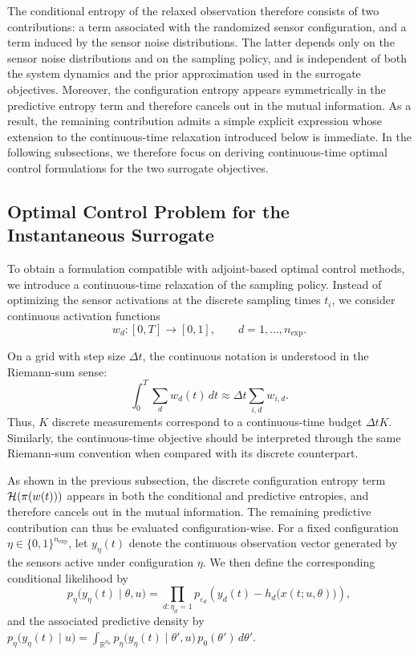 \documentclass[a4paper,11pt]{article}
\begin{document}
The conditional entropy of the relaxed observation therefore consists of two contributions: a term associated with the randomized sensor configuration, and a term induced by the sensor noise distributions. The latter depends only on the sensor noise distributions and on the sampling policy, and is independent of both the system dynamics and the prior approximation used in the surrogate objectives. Moreover, the configuration entropy appears symmetrically in the predictive entropy term and therefore cancels out in the mutual information. As a result, the remaining contribution admits a simple explicit expression whose extension to the continuous-time relaxation introduced below is immediate. In the following subsections, we therefore focus on deriving continuous-time optimal control formulations for the two surrogate objectives.

\subsection{Optimal Control Problem for the Instantaneous Surrogate}


To obtain a formulation compatible with adjoint-based optimal control methods, we introduce a continuous-time relaxation of the sampling policy.
Instead of optimizing the sensor activations at the discrete sampling times \(t_i\), we consider continuous activation functions
\[
w_d : [0,T] \to [0,1], \qquad d=1,\dots,n_{\mathrm{exp}}.
\]



On a grid with step size \(\Delta t\), the continuous notation is understood in
the Riemann-sum sense:
\[
\int_0^T \sum_d w_d(t)\,dt \approx \Delta t\sum_{i,d} w_{i,d}.
\]
Thus, \(K\) discrete measurements correspond to a continuous-time budget
\(\Delta t K\). Similarly, the continuous-time objective should be interpreted through the same
Riemann-sum convention when compared with its discrete counterpart.

As shown in the previous subsection, the discrete configuration entropy term \({\cal H}(\pi(w(t)))\) appears in both the conditional and predictive entropies, and therefore cancels out in the mutual information. The remaining predictive contribution can thus be evaluated configuration-wise.
For a fixed configuration \(\eta \in \{0,1\}^{n_{\mathrm{exp}}}\), let \(y_\eta(t)\) denote the continuous observation vector generated by the sensors active under configuration \(\eta\). We then define the corresponding conditional likelihood by
\begin{equation}
p_\eta\big(y_\eta(t)\mid\theta,u\big)
=
\prod_{d:\eta_d=1}
p_{\varepsilon_d}\!\left(y_d(t)-h_d\bigl(x(t;u,\theta)\bigr)\right),
\end{equation}
and the associated predictive density by
\(
p_\eta\big(y_\eta(t)\mid u\big)
=
\int_{\mathbb{R}^{n_\theta}}
p_\eta\big(y_\eta(t)\mid \theta',u\big)\,p_0(\theta')\,d\theta'.
\)
\end{document}
